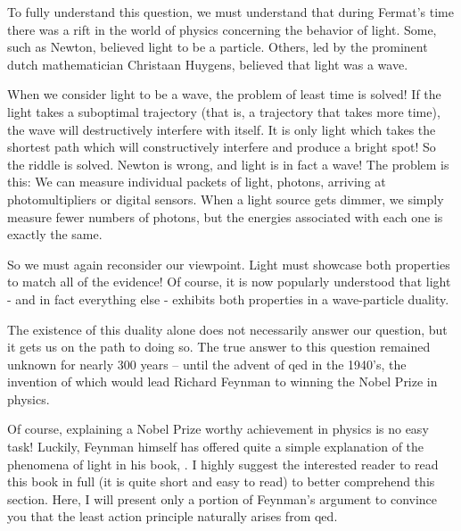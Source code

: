 To fully understand this question, we must understand that during Fermat's time there was a rift in the world of physics concerning the behavior of light. Some, such as Newton, believed light to be a particle. Others, led by the prominent dutch mathematician Christaan Huygens, believed that light was a wave.

When we consider light to be a wave, the problem of least time is solved! If the light takes a suboptimal trajectory (that is, a trajectory that takes more time), the wave will destructively interfere with itself. It is only light which takes the shortest path which will constructively interfere and produce a  bright spot! So the riddle is solved. Newton is wrong, and light is in fact a wave! The problem is this: We can measure individual packets of light, photons, arriving at photomultipliers or digital sensors. When a light source gets dimmer, we simply measure fewer numbers of photons, but the energies associated with each one is exactly the same.

So we must again reconsider our viewpoint. Light must showcase both properties to match all of the evidence! Of course, it is now popularly understood that light - and in fact everything else - exhibits both properties in a wave-particle duality.

The existence of this duality alone does not necessarily answer our question, but it gets us on the path to doing so. The true answer to this question remained unknown for nearly 300 years -- until the advent of \gls{qed} in the 1940's, the invention of which would lead Richard Feynman to winning the Nobel Prize in physics.

Of course, explaining a Nobel Prize worthy achievement in physics is no easy task! Luckily, Feynman himself has offered quite a simple explanation of the phenomena of light in his book, \cite{richard_phillips_feynman_qed_1988}. I highly suggest the interested reader to read this book in full (it is quite short and easy to read) to better comprehend this section. Here, I will present only a portion of Feynman's argument to convince you that the least action principle naturally arises from \gls{qed}.

